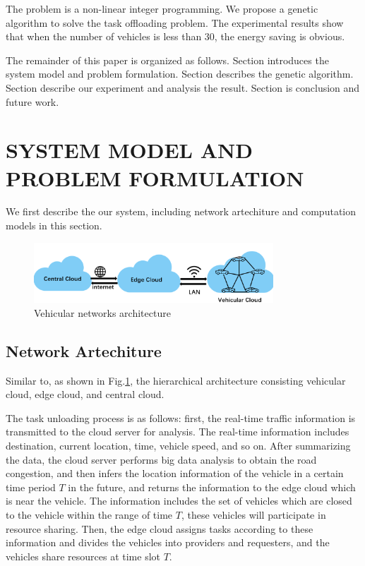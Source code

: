 \documentclass[conference]{IEEEtran}
\begin{document}
The problem is a non-linear integer programming. 
We propose a genetic algorithm to solve the task offloading problem. 
The experimental results show that when the number of vehicles is less than 30, the energy saving is obvious. 

The remainder of this paper is organized as follows. Section \uppercase\expandafter{} introduces the system model and problem formulation. 
Section \uppercase\expandafter{} describes the genetic algorithm. 
Section \uppercase\expandafter{}  describe our experiment and analysis the result. 
Section \uppercase\expandafter{}
is conclusion and future work. 

\section{SYSTEM MODEL AND PROBLEM FORMULATION}
We first describe the our system, including network artechiture and computation models in this section.


\begin{figure}[h]
	\centering
	\includegraphics[width=0.80\textwidth]{pic2.png}
	\caption{Vehicular networks architecture}
	\label{cloud}
	
\end{figure}

\subsection{Network Artechiture}
Similar to\cite{yu2013toward}, as shown in Fig.\ref{cloud}, the hierarchical architecture consisting vehicular cloud, edge cloud, and central cloud.

The task unloading process is as follows: first, the real-time traffic information is transmitted to the cloud server for analysis. The real-time information includes destination, current location, time, vehicle speed, and so on. After summarizing the data, the cloud server performs big data analysis to obtain the road congestion, and then infers the location information of the vehicle in a certain time period $T$ in the future, and returns the information to the edge cloud which is near the vehicle. The information includes the set of vehicles which are closed to the vehicle within the range of time $T$, these vehicles will participate in resource sharing.
Then, the edge cloud assigns tasks according to these information and divides the vehicles into providers and requesters, and the vehicles share resources at time slot $T$.
\end{document}
